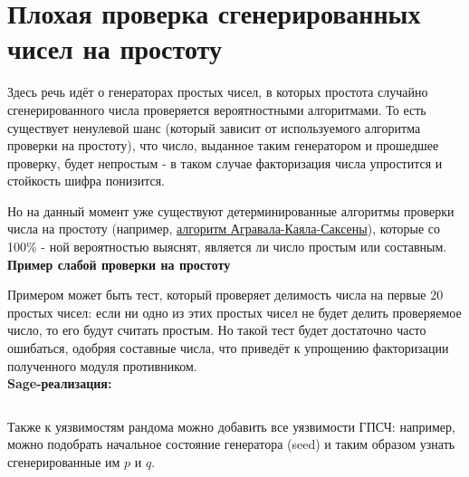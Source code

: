 \documentclass[12pt,a4paper]{scrartcl}
\begin{document}
\section{Плохая проверка сгенерированных чисел на простоту}

Здесь речь идёт о генераторах простых чисел, в которых простота случайно сгенерированного числа проверяется вероятностными алгоритмами. То есть существует ненулевой шанс (который зависит от используемого алгоритма проверки на простоту), что число, выданное таким генератором и прошедшее проверку, будет непростым - в таком случае факторизация числа упростится и стойкость шифра понизится.

Но на данный момент уже существуют детерминированные алгоритмы проверки числа на простоту (например, \href{https://yatb.kksctf.ru/}{алгоритм Агравала-Каяла-Саксены}), которые со 100\% - ной вероятностью выяснят, является ли число простым или составным.\\

\textbf{Пример слабой проверки на простоту}

Примером может быть тест, который проверяет делимость числа на первые 20 простых чисел: если ни одно из этих простых чисел не будет делить проверяемое число, то его будут считать простым. Но такой тест будет достаточно часто ошибаться, одобряя составные числа, что приведёт к упрощению факторизации полученного модуля противником.\\

\textbf{Sage-реализация:}\\

\inputminted[tabsize=4,obeytabs,fontsize=\footnotesize]{python3}{./RSA_scripts/prime.sage}

Также к уязвимостям рандома можно добавить все уязвимости ГПСЧ: например, можно подобрать начальное состояние генератора (seed) и таким образом узнать сгенерированные им $p$ и $q$.\\
\end{document}
